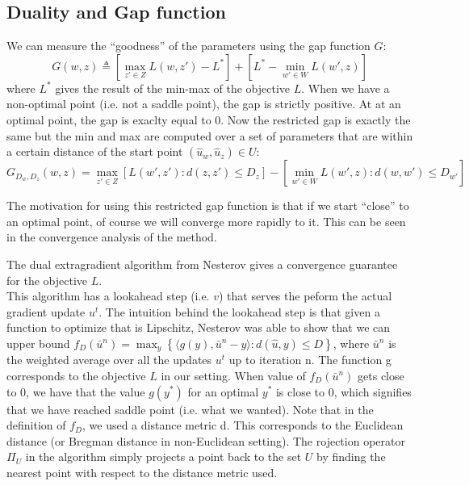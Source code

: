 \clearpage
\subsection{Duality and Gap function}
We can measure the ``goodness'' of the parameters using the gap function
${G}$:
\begin{equation}
  {G}( w,  z) \triangleq \left[ \max_{ z' \in {Z}}
{L}( w, z') - {L}^* \right] + \left[ {L}^* -
\min_{ w' \in {W}} {L}( w',  z) \right]
\end{equation}
where ${L}^*$ gives the result of the min-max of the objective
${L}$. When we have a non-optimal point (i.e. not a saddle point), the
gap is strictly positive. At at an optimal point, the gap is exaclty equal to 0.
Now the restricted gap is exactly the same but the min and max are computed over
a set of parameters that are within a certain distance of the start point
$(\hat{ u}_{ w},\hat{ u}_{ z}) \in {U}$:
\begin{equation}
  {G}_{D_{ w}, D_{ z}}( w,  z) = \max_{ z' \in
{Z}} \left[ {L}( w',  z') : d( z,  z') \leq
D_{ z} \right] - \left [ \min_{ w' \in {W}} {L}( w',
 z) : d( w,  w') \leq D_{ w'} \right ]
\end{equation}

The motivation for using this restricted gap function is that if we start
``close'' to an optimal point, of course we will converge more rapidly to it.
This can be seen in the convergence analysis of the method.

The dual extragradient algorithm from Nesterov gives a convergence guarantee for
the objective ${L}$.\\

This algorithm has a lookahead step (i.e. $v$) that serves the peform the actual
gradient update $u^t$. The intuition behind the lookahead step is that given a
function to optimize that is Lipschitz, Nesterov was able to show that we can
upper bound $f_{D}(\bar{u}^n) = \max_y \left \{ \langle g(y),\bar{u}^n - y
\rangle : d(\hat{u},y) \leq D \right \}$, where $\bar{u}^n$ is the weighted
average over all the updates $u^t$ up to iteration n. The function g corresponds
to the objective ${L}$ in our setting. When value of $f_D(\bar{u}^n)$ gets close
to 0, we have that the value $g(y^*)$ for an optimal $y^*$ is close to 0, which
signifies that we have reached saddle point (i.e. what we wanted). Note that in
the definition of $f_D$, we used a
distance metric d. This corresponds to the Euclidean distance (or Bregman
distance in non-Euclidean setting). The rojection operator $\Pi_{{U}}$ in the
algorithm simply projects a point back to the set ${U}$ by finding the nearest
point with respect to the distance metric used.

